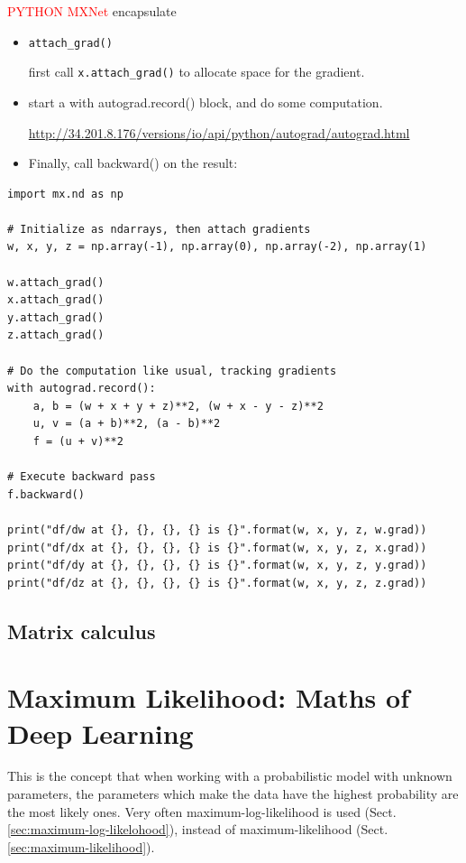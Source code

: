 \textcolor{red}{PYTHON MXNet} encapsulate
\begin{itemize}
  \item \verb!attach_grad()! 
  
   first call \verb!x.attach_grad()! to allocate space for the gradient.
   
   \item  start a with autograd.record() block, and do some computation. 
   
   \url{http://34.201.8.176/versions/io/api/python/autograd/autograd.html}
   
   \item Finally, call backward() on the result:
\end{itemize}
\begin{lstlisting}
import mx.nd as np

# Initialize as ndarrays, then attach gradients
w, x, y, z = np.array(-1), np.array(0), np.array(-2), np.array(1)

w.attach_grad()
x.attach_grad()
y.attach_grad()
z.attach_grad()

# Do the computation like usual, tracking gradients
with autograd.record():
    a, b = (w + x + y + z)**2, (w + x - y - z)**2
    u, v = (a + b)**2, (a - b)**2
    f = (u + v)**2

# Execute backward pass
f.backward()

print("df/dw at {}, {}, {}, {} is {}".format(w, x, y, z, w.grad))
print("df/dx at {}, {}, {}, {} is {}".format(w, x, y, z, x.grad))
print("df/dy at {}, {}, {}, {} is {}".format(w, x, y, z, y.grad))
print("df/dz at {}, {}, {}, {} is {}".format(w, x, y, z, z.grad))
\end{lstlisting}


\section{Matrix calculus}


\chapter{Maximum Likelihood: Maths of Deep Learning}

This is the concept that when working with a probabilistic model with unknown
parameters, the parameters which make the data have the highest probability are
the most likely ones. Very often maximum-log-likelihood is used
(Sect.\ref{sec:maximum-log-likelohood}), instead of maximum-likelihood
(Sect.\ref{sec:maximum-likelihood}).

